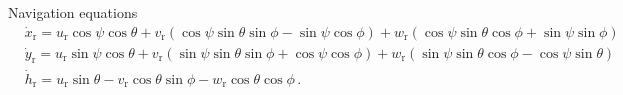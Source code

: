 Navigation equations  
\begin{equation}\label{eq4.45}
\begin{aligned}
& \dot{x}_{\mathrm{r}}=u_{\mathrm{r}} \cos \psi \cos \theta+v_{\mathrm{r}}(\cos \psi \sin \theta \sin \phi-\sin \psi \cos \phi)+w_{\mathrm{r}}(\cos \psi \sin \theta \cos \phi+\sin \psi \sin \phi) \\
& \dot{y}_{\mathrm{r}}=u_{\mathrm{r}} \sin \psi \cos \theta+v_{\mathrm{r}}(\sin \psi \sin \theta \sin \phi+\cos \psi \cos \phi)+w_{\mathrm{r}}(\sin \psi \sin \theta \cos \phi-\cos \psi \sin \theta) \\
& \dot{h}_{\mathrm{r}}=u_{\mathrm{r}} \sin \theta-v_{\mathrm{r}} \cos \theta \sin \phi-w_{\mathrm{r}} \cos \theta \cos \phi\, .
\end{aligned}
\end{equation}

